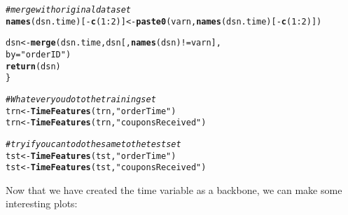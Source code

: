 \documentclass[10pt]{report}
\makeatletter
\newcommand{\hlnum}[1]{\textcolor[rgb]{0.686,0.059,0.569}{#1}}%
\newcommand{\hlstr}[1]{\textcolor[rgb]{0.192,0.494,0.8}{#1}}%
\newcommand{\hlcom}[1]{\textcolor[rgb]{0.678,0.584,0.686}{\textit{#1}}}%
\newcommand{\hlopt}[1]{\textcolor[rgb]{0,0,0}{#1}}%
\newcommand{\hlstd}[1]{\textcolor[rgb]{0.345,0.345,0.345}{#1}}%
\newcommand{\hlkwb}[1]{\textcolor[rgb]{0.69,0.353,0.396}{#1}}%
\newcommand{\hlkwc}[1]{\textcolor[rgb]{0.333,0.667,0.333}{#1}}%
\newcommand{\hlkwd}[1]{\textcolor[rgb]{0.737,0.353,0.396}{\textbf{#1}}}%
\newenvironment{kframe}{%
 \def\at@end@of@kframe{}%
 \ifinner\ifhmode%
  \def\at@end@of@kframe{\end{minipage}}%
  \begin{minipage}{\columnwidth}%
 \fi\fi%
 \def\FrameCommand##1{\hskip\@totalleftmargin \hskip-\fboxsep
 \colorbox{shadecolor}{##1}\hskip-\fboxsep
     \hskip-\linewidth \hskip-\@totalleftmargin \hskip\columnwidth}%
 \MakeFramed {\advance\hsize-\width
   \@totalleftmargin\z@ \linewidth\hsize
   \@setminipage}}%
 {\par\unskip\endMakeFramed%
 \at@end@of@kframe}
\newenvironment{knitrout}{}{} %
\makeatother
\begin{document}
\begin{knitrout}
\begin{kframe}
\begin{alltt}
    \hlcom{# merge with original data set}
    \hlkwd{names}\hlstd{(dsn.time)[}\hlopt{-}\hlkwd{c}\hlstd{(}\hlnum{1}\hlopt{:}\hlnum{2}\hlstd{)]} \hlkwb{<-} \hlkwd{paste0}\hlstd{(varn,} \hlkwd{names}\hlstd{(dsn.time)[}\hlopt{-}\hlkwd{c}\hlstd{(}\hlnum{1}\hlopt{:}\hlnum{2}\hlstd{)])}

    \hlstd{dsn} \hlkwb{<-} \hlkwd{merge}\hlstd{(dsn.time, dsn[,} \hlkwd{names}\hlstd{(dsn)} \hlopt{!=} \hlstd{varn],}
        \hlkwc{by} \hlstd{=} \hlstr{"orderID"}\hlstd{)}
    \hlkwd{return}\hlstd{(dsn)}
\hlstd{\}}

\hlcom{# Whatever you do to the training set}
\hlstd{trn} \hlkwb{<-} \hlkwd{TimeFeatures}\hlstd{(trn,} \hlstr{"orderTime"}\hlstd{)}
\hlstd{trn} \hlkwb{<-} \hlkwd{TimeFeatures}\hlstd{(trn,} \hlstr{"couponsReceived"}\hlstd{)}

\hlcom{# try if you can to do the same to the test set}
\hlstd{tst} \hlkwb{<-} \hlkwd{TimeFeatures}\hlstd{(tst,} \hlstr{"orderTime"}\hlstd{)}
\hlstd{tst} \hlkwb{<-} \hlkwd{TimeFeatures}\hlstd{(tst,} \hlstr{"couponsReceived"}\hlstd{)}
\end{alltt}
\end{kframe}
\end{knitrout}

Now that we have created the time variable as a backbone, 
we can make some interesting plots:
\end{document}
